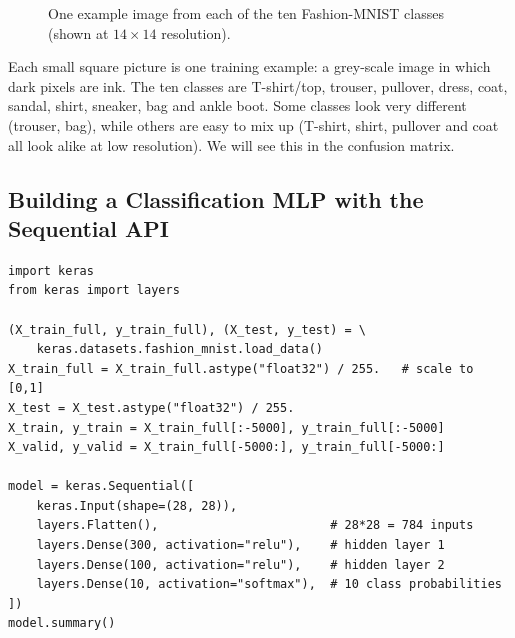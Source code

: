 \begin{figure}[!htbp]
\centering
{}
\caption{One example image from each of the ten Fashion-MNIST classes (shown at $14\times14$ resolution).}\label{fig:fmnist}
\end{figure}

\begin{explain}
Each small square picture is one training example: a grey-scale image in which dark pixels are ink. The ten classes are T-shirt/top, trouser, pullover, dress, coat, sandal, shirt, sneaker, bag and ankle boot. Some classes look very different (trouser, bag), while others are easy to mix up (T-shirt, shirt, pullover and coat all look alike at low resolution). We will see this in the confusion matrix.
\end{explain}

\subsection{Building a Classification MLP with the Sequential API}

\begin{lstlisting}
import keras
from keras import layers

(X_train_full, y_train_full), (X_test, y_test) = \
    keras.datasets.fashion_mnist.load_data()
X_train_full = X_train_full.astype("float32") / 255.   # scale to [0,1]
X_test = X_test.astype("float32") / 255.
X_train, y_train = X_train_full[:-5000], y_train_full[:-5000]
X_valid, y_valid = X_train_full[-5000:], y_train_full[-5000:]

model = keras.Sequential([
    keras.Input(shape=(28, 28)),
    layers.Flatten(),                        # 28*28 = 784 inputs
    layers.Dense(300, activation="relu"),    # hidden layer 1
    layers.Dense(100, activation="relu"),    # hidden layer 2
    layers.Dense(10, activation="softmax"),  # 10 class probabilities
])
model.summary()
\end{lstlisting}

